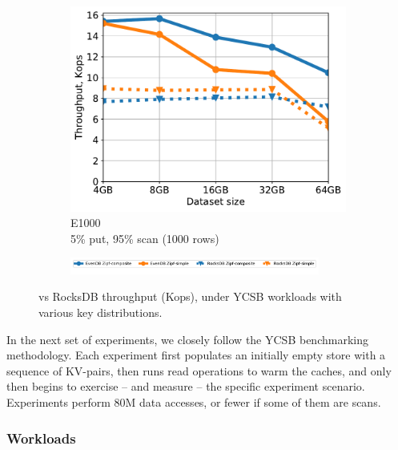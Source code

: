 \begin{figure}[tb]
\begin{subfigure}{0.3\linewidth}
\includegraphics[width=\textwidth]{figs/Workload_E+_line.pdf}
\caption{E1000 \\5\% put, 95\% scan (1000 rows)}
\label{fig:throughput:e1000}
\end{subfigure}
\begin{subfigure}{\linewidth}
\centerline{
\includegraphics[width=0.9\textwidth]{figs/legend.pdf}
\vspace{-5mm}
}
\end{subfigure}
\caption{
{\sys\/ vs RocksDB throughput (Kops), under YCSB workloads with various key distributions.}
}
\label{fig:throughput}
\end{figure}

In the next set of experiments, we closely follow the YCSB benchmarking methodology. 
Each experiment first  populates an initially empty store with a sequence of KV-pairs, then  
runs read operations to warm the caches, and only then begins to exercise -- and measure --  the specific experiment scenario. 
Experiments  perform 80M data accesses, or fewer if some of them are scans.


\subsubsection{Workloads}

